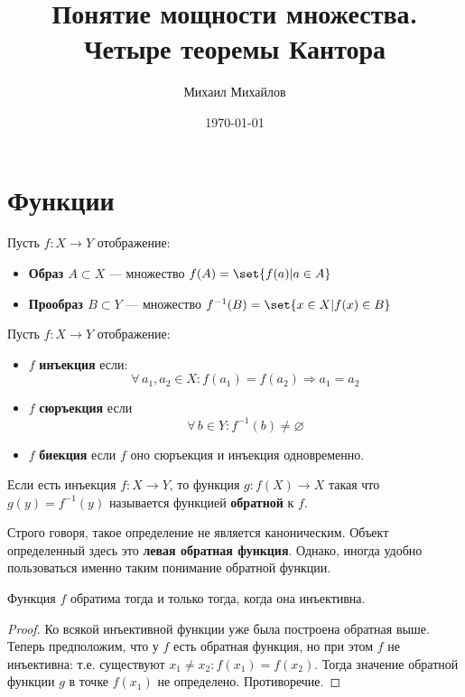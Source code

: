 \documentclass{article}
\title{Понятие мощности множества. Четыре теоремы Кантора}
\author{Михаил Михайлов}
\date{\today}
\begin{document}
\maketitle
\tableofcontents

\newpage
\section{Функции}
\begin{definition}
    \label{def:function-image-preimage}
    Пусть \(f: X \rightarrow Y\) отображение:
    \begin{itemize}
        \item \textbf{Образ \(A \subset X\)} --- множество \(f(A) = \set{f(a) | a \in A}\)
        \item \textbf{Прообраз \(B \subset Y\)} --- множество \(f^{-1}(B) = \set{x \in X | f(x) \in B}\)
    \end{itemize}
\end{definition}

\begin{definition}
    \label{def:function-injection-surjection-bijection}
    Пусть \(f: X \rightarrow Y\) отображение:
    \begin{itemize}
        \item \(f\) \textbf{инъекция} если: 
        \[\forall\, a_1, a_2 \in X: f(a_1) = f(a_2) \Rightarrow a_1 = a_2\]
        \item \(f\) \textbf{сюръекция} если
        \[\forall\, b \in Y: f^{-1}(b) \neq \varnothing\]
        \item \(f\) \textbf{биекция} если \(f\) оно сюръекция и инъекция одновременно.
    \end{itemize}
\end{definition}

\begin{definition}
    \label{def:left-inverse-function}
    Если есть инъекция \(f: X \rightarrow Y\), то функция \(g: f(X) \rightarrow X\) такая что \(g(y) = f^{-1}(y)\) называется функцией \textbf{обратной} к \(f\).
\end{definition}
\begin{remark}
    Строго говоря, такое определение не является каноническим. Объект определенный здесь это \textbf{левая обратная функция}. Однако, иногда удобно пользоваться именно таким понимание обратной функции.
\end{remark}

\begin{proposition}
    \label{prop:left-inverse-injection}
    Функция \(f\) обратима тогда и только тогда, когда она инъективна. 
\end{proposition}
\begin{proof}
    Ко всякой инъективной функции уже была построена обратная выше.
    Теперь предположим, что у \(f\) есть обратная функция, но при этом \(f\) не инъективна: т.е. существуют \(x_1 \ne x_2: f(x_1) = f(x_2)\). Тогда значение обратной функции \(g\) в точке \(f(x_1)\) не определено. Противоречие. 
\end{proof}
\end{document}
